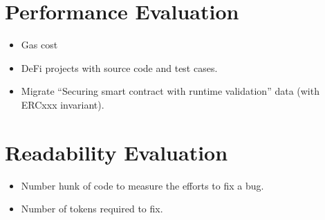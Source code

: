 \section{Performance Evaluation}
\label{sec:eval}
\begin{itemize}
	\item Gas cost
	\item DeFi projects with source code and test cases.
	\item Migrate ``Securing smart contract with runtime validation'' data (with ERCxxx invariant).
\end{itemize}

\section{Readability Evaluation}
\begin{itemize}
	\item Number hunk of code to measure the efforts to fix a bug.
	\item Number of tokens required to fix.
\end{itemize}
